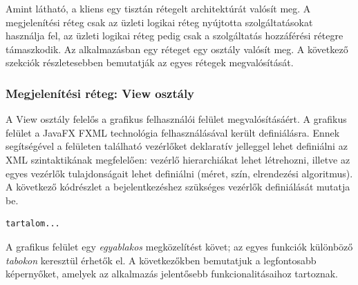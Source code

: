 \documentclass[11pt, a4paper]{article}
\begin{document}
	Amint látható, a kliens egy tisztán rétegelt architektúrát valósít meg. A megjelenítési réteg csak az üzleti logikai réteg  nyújtotta szolgáltatásokat használja fel, az üzleti logikai réteg pedig csak a szolgáltatás hozzáférési rétegre támaszkodik. Az alkalmazásban egy réteget egy osztály valósít meg. A következő szekciók részletesebben bemutatják az egyes rétegek megvalósítását.
     
     \subsubsection{Megjelenítési réteg: View osztály}
     A View osztály felelős a grafikus felhasználói felület megvalósításáért. A grafikus felület a JavaFX FXML technológia felhasználásával került definiálásra. Ennek segítségével a felületen található vezérlőket deklaratív jelleggel lehet definiálni az XML szintaktikának megfelelően: vezérlő hierarchiákat lehet létrehozni, illetve az egyes vezérlők tulajdonságait lehet definiálni (méret, szín, elrendezési algoritmus). A következő kódrészlet a bejelentkezéshez szükséges vezérlők definiálását mutatja be.
     
\begin{lstlisting}
tartalom...
\end{lstlisting}
     
     A grafikus felület egy \emph{egyablakos} megközelítést követ; az egyes funkciók különböző \emph{tabokon} keresztül érhetők el. A következőkben bemutatjuk a legfontosabb képernyőket, amelyek az alkalmazás jelentősebb funkcionalitásaihoz tartoznak.
     
\end{document}
